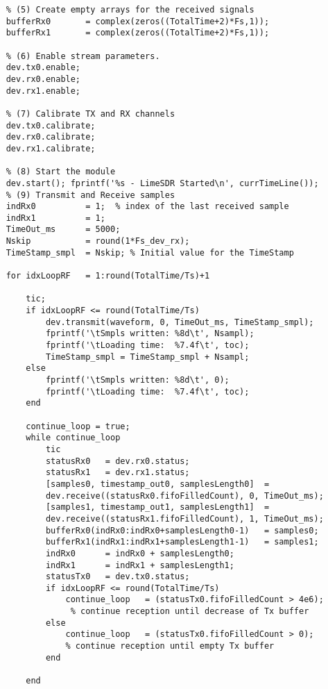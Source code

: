 \begin{verbatim}
    % (5) Create empty arrays for the received signals
    bufferRx0       = complex(zeros((TotalTime+2)*Fs,1));
    bufferRx1       = complex(zeros((TotalTime+2)*Fs,1));
    
    % (6) Enable stream parameters. 
    dev.tx0.enable;
    dev.rx0.enable;
    dev.rx1.enable;
    
    % (7) Calibrate TX and RX channels
    dev.tx0.calibrate;
    dev.rx0.calibrate;
    dev.rx1.calibrate;
    
    % (8) Start the module
    dev.start(); fprintf('%s - LimeSDR Started\n', currTimeLine());
    % (9) Transmit and Receive samples
    indRx0          = 1;  % index of the last received sample
    indRx1          = 1;
    TimeOut_ms      = 5000;
    Nskip          	= round(1*Fs_dev_rx); 
    TimeStamp_smpl  = Nskip; % Initial value for the TimeStamp
   
    for idxLoopRF   = 1:round(TotalTime/Ts)+1 
        
        tic;
        if idxLoopRF <= round(TotalTime/Ts)
            dev.transmit(waveform, 0, TimeOut_ms, TimeStamp_smpl); 
            fprintf('\tSmpls written: %8d\t', Nsampl);
            fprintf('\tLoading time:  %7.4f\t', toc);
            TimeStamp_smpl = TimeStamp_smpl + Nsampl;
        else
            fprintf('\tSmpls written: %8d\t', 0);
            fprintf('\tLoading time:  %7.4f\t', toc);
        end
        
        continue_loop = true;
        while continue_loop
            tic
            statusRx0  	= dev.rx0.status;
            statusRx1  	= dev.rx1.status;
            [samples0, timestamp_out0, samplesLength0]  = 
            dev.receive((statusRx0.fifoFilledCount), 0, TimeOut_ms);
            [samples1, timestamp_out1, samplesLength1]  = 
            dev.receive((statusRx1.fifoFilledCount), 1, TimeOut_ms);
            bufferRx0(indRx0:indRx0+samplesLength0-1)   = samples0;
            bufferRx1(indRx1:indRx1+samplesLength1-1)   = samples1;
            indRx0    	= indRx0 + samplesLength0;
            indRx1    	= indRx1 + samplesLength1;
            statusTx0  	= dev.tx0.status;
            if idxLoopRF <= round(TotalTime/Ts)
                continue_loop	= (statusTx0.fifoFilledCount > 4e6);   
                 % continue reception until decrease of Tx buffer
            else
                continue_loop   = (statusTx0.fifoFilledCount > 0);      
                % continue reception until empty Tx buffer
            end
            
        end


\end{verbatim}
